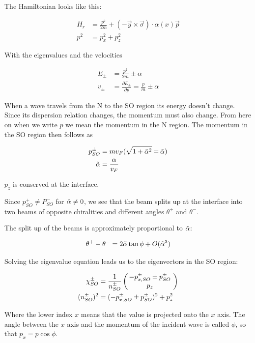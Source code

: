 The Hamiltonian looks like this:

\begin{align}
    H_r &= \frac{p^2}{2m} + (-\vec y \times \vec \sigma) \cdot
            \alpha(x) \vec p\\ 
    p^2 &= p_x^2 + p_z^2
\end{align}

With the eigenvalues and the velocities

\begin{align}
    E_{\pm} &= \frac{p^2}{2m} \pm \alpha \\
    v_{\pm} &= \frac{\partial E_{\pm}}{\partial p} = \frac{p}{m} \pm \alpha
\end{align}

When a wave travels from the N to the SO region its energy doesn't
change. Since its dispersion relation changes, the momentum must also
change. From here on when we write $p$ we mean the momentum in the N
region. The momentum in the SO region then follows as

\begin{align}
    \label{eq:pso}
    p_{SO}^{\pm} &= m v_F (\sqrt{1 + \tilde \alpha^2} \mp \tilde \alpha) \\
    \tilde\alpha &= \frac{\alpha}{v_F}
\end{align}

$p_z$ is conserved at the interface.

Since $p_{SO}^+ \not = P_{SO}^-$ for $\tilde \alpha \not = 0$, we see that
the beam splits up at the interface into two beams of opposite
chiralities and different angles $\theta^+$ and $\theta^-$.

The split up of the beams is approximately proportional to $\tilde \alpha$:

\begin{align}
    \theta^+ - \theta^- = 2 \tilde \alpha \tan \phi + O(\tilde \alpha^3)
\end{align}

Solving the eigenvalue equation leads us to the eigenvectors in the SO
region:

\begin{align*}
   \chi_{SO}^{\pm} &= \frac{1}{n_{SO}^{\pm}} 
                      \left(\hspace{-.8ex}\begin{array}{c}-p_{x,SO}^{\pm} \pm p_{SO}^\pm\\p_z\end{array}\hspace{-.4ex}\right) \\
    (n_{SO}^{\pm})^2 &= (-p_{x,SO}^{\pm} \pm p_{SO}^\pm)^2 + p_z^2
\end{align*}

Where the lower index $x$ means that the value is projected onto the
$x$ axis. The angle between the $x$ axis and the momentum of the
incident wave is called $\phi$, so that $p_x = p \cos \phi$.

